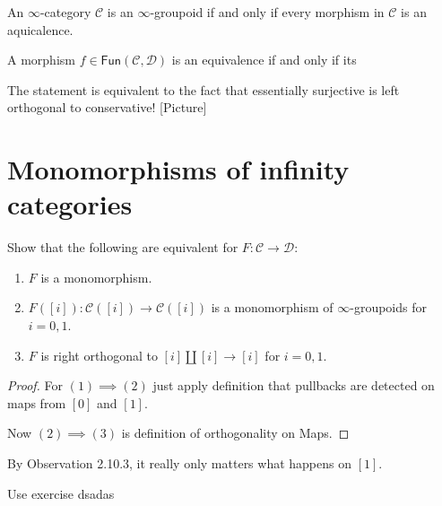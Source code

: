 \begin{lemma}
\label{lemma-groupoid-iff-every-morphism-is-equivalence}
An $\infty$-category $\mathcal{C}$ is an $\infty$-groupoid if
and only if every morphism in $\mathcal{C}$ is an aquicalence.
\end{lemma}

\begin{lemma}
\label{lemma-}
A morphism $f \in \mathsf{Fun}(\mathcal{C},\mathcal{D})$ is an equivalence
if and only if its
\end{lemma}

\begin{exercise}
\label{exercise-2.18}
The statement is equivalent to the fact that
essentially surjective is left orthogonal to 
conservative! [Picture]
\end{exercise}

\section{Monomorphisms of infinity categories}
\label{section-monomorphisms-infty-categories}

\begin{exercise}
\label{exercise-2.19}
Show that the following are equivalent for $F:\mathcal{C} \to \mathcal{D}$:
\begin{enumerate}
\item $F$ is a monomorphism.
\item $F([i]):\mathcal{C}([i]) \to \mathcal{C}([i])$ 
is a monomorphism of $\infty$-groupoids for $i=0,1$.
\item $F$ is right orthogonal to $[i]\amalg[i]\to[i]$ for $i=0,1$.
\end{enumerate}
\end{exercise}

\begin{proof}
For $(1) \implies (2)$ just apply definition
that pullbacks are detected on maps from $[0]$ and $[1]$.

Now $(2) \implies (3)$ is definition of orthogonality on Maps.
\end{proof}

\begin{remark}
\label{remark-only-on-1}
By Observation 2.10.3, it really only matters what happens on $[1]$.
\end{remark}

\begin{exercise}
\label{exercise-2.20}
Use exercise dsadas
\end{exercise}

